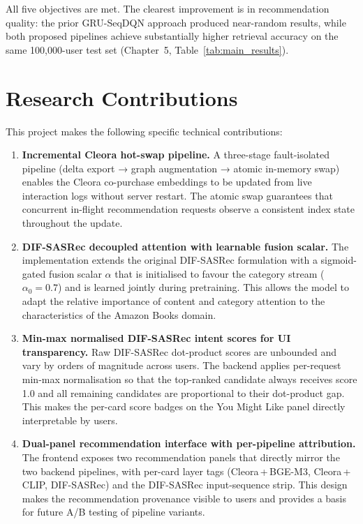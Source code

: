 All five objectives are met.
The clearest improvement is in recommendation quality: the prior GRU-SeqDQN approach produced near-random results, while both proposed pipelines achieve substantially higher retrieval accuracy on the same 100{,}000-user test set (Chapter~5, Table~\ref{tab:main_results}).


\section{Research Contributions}
\label{sec:contributions}

This project makes the following specific technical contributions:

\begin{enumerate}
    \item \textbf{Incremental Cleora hot-swap pipeline.}
    A three-stage fault-isolated pipeline (delta export → graph augmentation → atomic in-memory swap) enables the Cleora co-purchase embeddings to be updated from live interaction logs without server restart.
    The atomic swap guarantees that concurrent in-flight recommendation requests observe a consistent index state throughout the update.

    \item \textbf{DIF-SASRec decoupled attention with learnable fusion scalar.}
    The implementation extends the original DIF-SASRec formulation with a sigmoid-gated fusion scalar $\alpha$ that is initialised to favour the category stream ($\alpha_0 = 0.7$) and is learned jointly during pretraining.
    This allows the model to adapt the relative importance of content and category attention to the characteristics of the Amazon Books domain.

    \item \textbf{Min-max normalised DIF-SASRec intent scores for UI transparency.}
    Raw DIF-SASRec dot-product scores are unbounded and vary by orders of magnitude across users.
    The backend applies per-request min-max normalisation so that the top-ranked candidate always receives score 1.0 and all remaining candidates are proportional to their dot-product gap.
    This makes the per-card score badges on the You Might Like panel directly interpretable by users.

    \item \textbf{Dual-panel recommendation interface with per-pipeline attribution.}
    The frontend exposes two recommendation panels that directly mirror the two backend pipelines, with per-card layer tags (Cleora\,+\,BGE-M3, Cleora\,+\,CLIP, DIF-SASRec) and the DIF-SASRec input-sequence strip.
    This design makes the recommendation provenance visible to users and provides a basis for future A/B testing of pipeline variants.


\end{enumerate}
